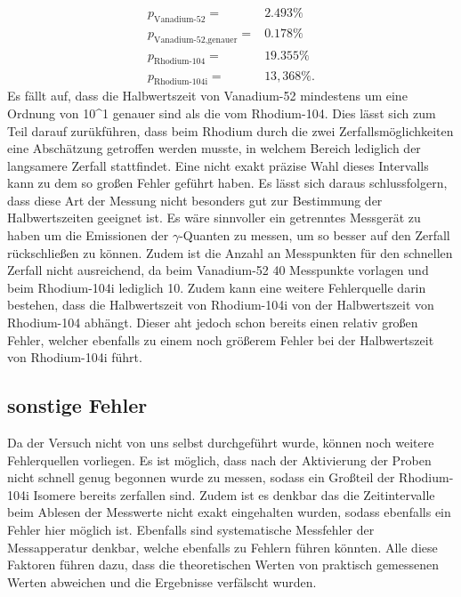 \begin{align*}

    p_\text{Vanadium-52} =&   2.493 \si{\percent}   \\
    p_\text{Vanadium-52,genauer} =& 0.178 \si{\percent}  \\
    p_\text{Rhodium-104} =&  19.355  \si{\percent}\\
    p_\text{Rhodium-104i} =&  13,368 \si{\percent}.

\end{align*}
\noindent
Es fällt auf, dass die Halbwertszeit von Vanadium-52 mindestens um eine Ordnung von 10^{1} genauer sind als die vom Rhodium-104. Dies lässt sich zum Teil darauf zurükführen,
dass beim Rhodium durch die zwei Zerfallsmöglichkeiten eine Abschätzung getroffen werden musste, in welchem Bereich lediglich der langsamere Zerfall stattfindet. Eine nicht exakt präzise
Wahl dieses Intervalls kann zu dem so großen Fehler geführt haben.
Es lässt sich daraus schlussfolgern, dass diese Art der Messung nicht besonders gut zur Bestimmung der Halbwertszeiten geeignet ist. Es wäre sinnvoller ein getrenntes Messgerät zu haben um die
Emissionen der $\gamma$-Quanten zu messen, um so besser auf den Zerfall rückschließen zu können.
\noindent
Zudem ist die Anzahl an Messpunkten für den schnellen Zerfall nicht ausreichend, da beim Vanadium-52 40 Messpunkte vorlagen und beim Rhodium-104i lediglich 10. Zudem kann eine weitere Fehlerquelle
darin bestehen, dass die Halbwertszeit von Rhodium-104i von der Halbwertszeit von Rhodium-104 abhängt. Dieser aht jedoch schon bereits einen relativ großen Fehler, welcher ebenfalls zu einem noch größerem
Fehler bei der Halbwertszeit von Rhodium-104i führt.

\subsection{sonstige Fehler}
Da der Versuch nicht von uns selbst durchgeführt wurde, können noch weitere Fehlerquellen vorliegen. Es ist möglich, dass nach der Aktivierung der Proben nicht schnell genug begonnen wurde zu messen, sodass
ein Großteil der Rhodium-104i Isomere bereits zerfallen sind. Zudem ist es denkbar das die Zeitintervalle beim Ablesen der Messwerte nicht exakt eingehalten wurden, sodass ebenfalls ein Fehler hier möglich ist.
Ebenfalls sind systematische Messfehler der Messapperatur denkbar, welche ebenfalls zu Fehlern führen könnten.
\noindent
Alle diese Faktoren führen dazu, dass die theoretischen Werten von praktisch gemessenen Werten abweichen und die Ergebnisse verfälscht wurden.